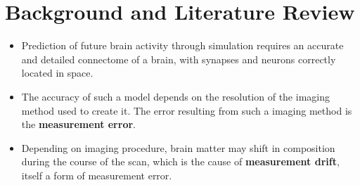 \chapter{Background and Literature Review}

\begin{itemize}
    \item Prediction of future brain activity through simulation requires an accurate and detailed connectome of a brain, with synapses and neurons correctly located in space.\autocite{bostrom_whole_2008}
    \item The accuracy of such a model depends on the resolution of the imaging method used to create it. The error resulting from such a imaging method is the \textbf{measurement error}. 
    \item Depending on imaging procedure, brain matter may shift in composition during the course of the scan, which is the cause of \textbf{measurement drift}, itself a form of measurement error.
\end{itemize}



